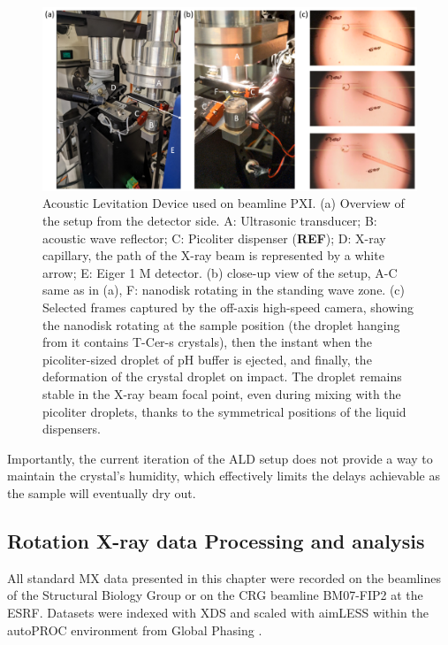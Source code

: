 \begin{figure}[H] %
    \centering
        \noindent \includegraphics[width=\textwidth]{images/T-Cer/ALD_setup.pdf}
    \caption{Acoustic Levitation Device used on beamline PXI. (a) Overview of the setup from the detector side. A: Ultrasonic transducer; B: acoustic wave reflector; C: Picoliter dispenser (\textbf{REF}); D: X-ray capillary, the path of the X-ray beam is represented by a white arrow; E: Eiger 1 M detector. (b) close-up view of the setup, A-C same as in (a), F: nanodisk rotating in the standing wave zone. (c) Selected frames captured by the off-axis high-speed camera, showing the nanodisk rotating at the sample position (the droplet hanging from it contains T-Cer-s crystals), then the instant when the picoliter-sized droplet of pH buffer is ejected, and finally, the deformation of the crystal droplet on impact.  The droplet remains stable in the X-ray beam focal point, even during mixing with the picoliter droplets, thanks to the symmetrical positions of the liquid dispensers.}\label{fig:T-Cer_ALD}
\end{figure}

Importantly, the current iteration of the ALD setup does not provide a way to maintain the crystal's humidity, which effectively limits the delays achievable as the sample will eventually dry out.  

\subsection{Rotation X-ray data Processing and analysis}

All standard MX data presented in this chapter were recorded on the beamlines of the Structural Biology Group or on the CRG beamline BM07-FIP2 at the ESRF. Datasets were indexed with XDS \parencite{kabschXDS2010} and scaled with aimLESS \parencite{evansHowGoodAre2013} within the autoPROC environment from Global Phasing \parencite{vonrheinAdvancesAutomatedData2018}. 

